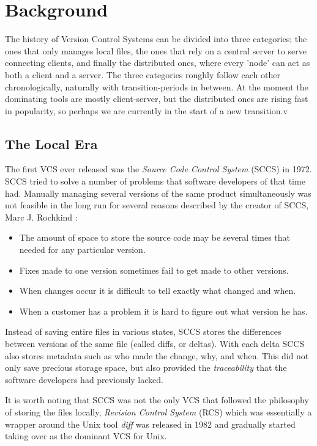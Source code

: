\documentclass{llncs}
\begin{document}
\section{Background}
\label{sec:background}

The history of Version Control Systems can be divided into three
categories; the ones that only manages local files, the ones that rely
on a central server to serve connecting clients, and finally the
distributed ones, where every 'node' can act as both a client and a
server. The three categories roughly follow each other
chronologically, naturally with transition-periods in between. At the
moment the dominating tools are mostly client-server, but the
distributed ones are rising fast in popularity, so perhaps we are
currently in the start of a new transition.v

\subsection{The Local Era}
The first VCS ever released was the \emph{Source Code Control System}
(SCCS) in 1972. SCCS tried to solve a number of problems that software
developers of that time had. Manually managing several versions of the
same product simultaneously was not feasible in the long run for
several reasons described by the creator of SCCS, Marc J. Rochkind
\cite{rochkind75}:

\begin{itemize}
 \item The amount of space to store the source code may be several
       times that needed for any particular version.
 \item Fixes made to one version sometimes fail to get made to
       other versions.
 \item When changes occur it is difficult to tell exactly what changed
       and when.
 \item When a customer has a problem it is hard to figure out what
       version he has.
\end{itemize}

Instead of saving entire files in various states, SCCS stores the
differences between versions of the same file (called diffs, or
deltas). With each delta SCCS also stores metadata such as who made
the change, why, and when. This did not only save precious storage
space, but also provided the \emph{traceability} that the software
developers had previously lacked\cite{rochkind75}.

It is worth noting that SCCS was not the only VCS that followed the
philosophy of storing the files locally, \emph{Revision Control
System} (RCS) which was essentially a wrapper around the Unix tool
\emph{diff} was released in 1982 and gradually started taking over as
the dominant VCS for Unix\cite{tichy85}.
\end{document}
